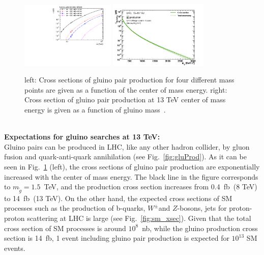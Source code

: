 \begin{figure}[!h]
\centering
  \includegraphics[width=0.4\textwidth]{Plots/SUSY/gluino_xsec}
  \includegraphics[width=0.42\textwidth]{Plots/SUSY/XSectionPlots_13TeV}
  \caption[Cross sections of gluino pair production]{ left: Cross sections of gluino pair production for four different mass points are given as a function of the center of mass energy. right: Cross section of gluino pair production at 13 TeV center of mass energy is given as a function of gluino mass~\cite{gluxsec}.
  }
  \label{fig:glu_xsec}
\end{figure}
\\
\textbf{Expectations for gluino searches at 13 TeV:}
\\
Gluino pairs can be produced in LHC, like any other hadron collider, by gluon fusion and quark-anti-quark annihilation (see Fig.~\ref{fig:gluProd}). As it can be seen in Fig.~\ref{fig:glu_xsec} (left), the cross sections of gluino pair  production are exponentially increased with the center of mass energy. The black line in the figure corresponds to $m_{\tilde{g}}=1.5$~TeV, and the production cross section increases from 0.4~fb~(8 TeV) to 14~fb~(13 TeV).
On the other hand, the expected cross sections of SM processes such as the production of b-quarks, $W^{\pm}$and $Z$-bosons, jets for proton-proton scattering at LHC is large (see Fig.~\ref{fig:sm_xsec}). Given that the total cross section of SM processes is around $10^8$~nb, while the gluino production cross section is 14~fb, 1 event including gluino pair production is expected for $10^{13}$ SM events.
